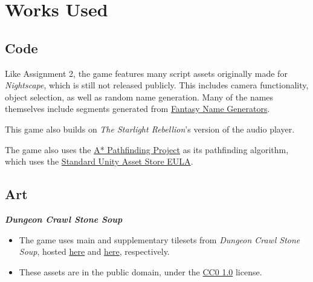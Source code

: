 \documentclass[10pt]{article}
\begin{document}



\section{Works Used}


\subsection{Code}

Like Assignment 2, the game features many script assets originally made for \textit{Nightscape},
which is still not released publicly. This includes camera functionality, object selection, as well as
random name generation. Many of the names themselves include segments generated from
\href{https://www.fantasynamegenerators.com/}{Fantasy Name Generators}.

This game also builds on \textit{The Starlight Rebellion}'s version of the audio player.

The game also uses the \href{https://arongranberg.com/astar/}{A* Pathfinding Project} as its pathfinding algorithm,
which uses the \href{https://unity3d.com/legal/as_terms}{Standard Unity Asset Store EULA}.

\subsection{Art}

\textbf{\textit{Dungeon Crawl Stone Soup}}
\begin{itemize}
    \item The game uses main and supplementary tilesets from \textit{Dungeon Crawl Stone Soup}, hosted \href{https://opengameart.org/content/dungeon-crawl-32x32-tiles}{here}
        and \href{https://opengameart.org/content/dungeon-crawl-32x32-tiles-supplemental}{here}, respectively.
    \item These assets are in the public domain, under the \href{https://creativecommons.org/publicdomain/zero/1.0/}{CC0 1.0} license.
\end{itemize}
\end{document}
